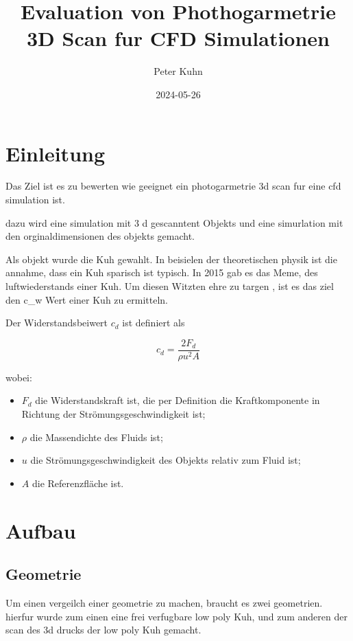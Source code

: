 \documentclass[a4paper,12pt]{article}
\title{Evaluation von Phothogarmetrie 3D Scan fur CFD Simulationen}
\author{Peter Kuhn}
\date{2024-05-26}
\begin{document}
\maketitle

\tableofcontents

\section{Einleitung}\label{sec:Einleitung}
Das Ziel ist es zu bewerten wie geeignet ein photogarmetrie 3d scan fur eine cfd simulation ist.

dazu wird eine simulation mit 3 d gescanntent Objekts und eine simurlation mit den orginaldimensionen des objekts gemacht.

Als objekt wurde die Kuh gewahlt.  In beisielen der theoretischen physik ist die annahme, dass  ein Kuh sparisch ist typisch. In 2015 gab es das Meme, des luftwiederstands einer Kuh. Um diesen Witzten ehre zu targen , ist es das ziel den c_w Wert einer Kuh zu ermitteln.

Der Widerstandsbeiwert \( c_d \) ist definiert als

\begin{equation}
c_d = \frac{2 F_d}{\rho u^2 A}
\end{equation}

wobei:
\begin{itemize}
    \item \( F_d \) die Widerstandskraft ist, die per Definition die Kraftkomponente in Richtung der Strömungsgeschwindigkeit ist; \cite{source9}
    \item \( \rho \) die Massendichte des Fluids ist; \cite{source10}
    \item \( u \) die Strömungsgeschwindigkeit des Objekts relativ zum Fluid ist;
    \item \( A \) die Referenzfläche ist.
\end{itemize}

\section{Aufbau}

\subsection{Geometrie}
Um einen vergeilch einer geometrie zu machen, braucht es zwei geometrien. hierfur wurde zum einen eine frei verfugbare low poly Kuh, und zum anderen der scan des 3d drucks der low poly Kuh gemacht.
\end{document}
